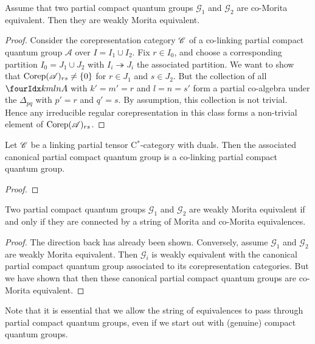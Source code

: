 
\begin{Prop} Assume that two partial compact quantum groups $\mathscr{G}_1$ and $\mathscr{G}_2$ are co-Morita equivalent. Then they are weakly Morita equivalent.
\end{Prop} 
\begin{proof} %
Consider the corepresentation category $\mathscr{C}$ of a co-linking partial compact quantum group $\mathscr{A}$ over $I = I_1\cup I_2$. Fix $r\in I_0$, and choose a corresponding partition $I_0 = J_1\cup J_2$ with $I_i \twoheadrightarrow J_i$ the associated partition. We want to show that $\mathrm{Corep}(\mathscr{A})_{rs} \neq \{0\}$ for $r\in J_1$ and $s\in J_2$. But  the collection of all $\Gr{A}{k}{l}{m}{n}$ with $k'=m'=r$ and $l=n=s'$ form a partial co-algebra under the $\Delta_{pq}$ with $p'=r$ and $q'=s$.  By assumption, this collection is not trivial. Hence any irreducible regular corepresentation in this class forms a non-trivial element of $\mathrm{Corep}(\mathscr{A})_{rs}$.
\end{proof}


\begin{Prop} Let $\mathscr{C}$ be a linking partial tensor C$^*$-category with duals. Then the associated canonical partial compact quantum group is a co-linking partial compact quantum group. 
\end{Prop} 

\begin{proof}

\end{proof} 

\begin{Theorem} Two partial compact quantum groups $\mathscr{G}_1$ and $\mathscr{G}_2$ are weakly Morita equivalent if and only if they are connected by a string of Morita and co-Morita equivalences. 
\end{Theorem}

\begin{proof} The direction back has already been shown. Conversely, assume $\mathscr{G}_1$ and $\mathscr{G}_2$ are weakly Morita equivalent. Then $\mathscr{G}_i$ is weakly equivalent with the canonical partial compact quantum group associated to its corepresentation categories. But we have shown that then these canonical partial compact quantum groups are co-Morita equivalent. 
\end{proof} 

\begin{Rem} Note that it is essential that we allow the string of equivalences to pass through partial compact quantum groups, even if we start out with (genuine) compact quantum groups.\end{Rem}







